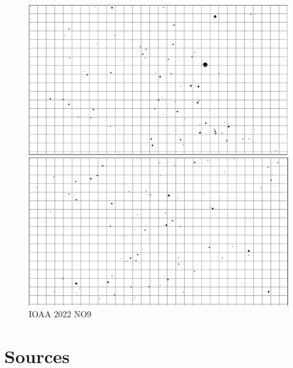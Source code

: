 \documentclass[a4paper,12pt]{extarticle}
\begin{document}
\begin{figure}[H]
	\centering
	\includegraphics[width=0.95\linewidth]{ioaa22_4.png}
	\caption{IOAA 2022 NO9}
\end{figure}
\clearpage
\section{Sources}
\end{document}
